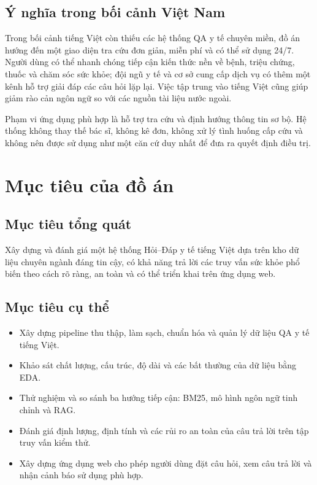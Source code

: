 \documentclass[12pt,a4paper,oneside]{report}
\begin{document}
\subsection{Ý nghĩa trong bối cảnh Việt Nam}
Trong bối cảnh tiếng Việt còn thiếu các hệ thống QA y tế chuyên miền, đồ án hướng đến một giao diện tra cứu đơn giản, miễn phí và có thể sử dụng 24/7. Người dùng có thể nhanh chóng tiếp cận kiến thức nền về bệnh, triệu chứng, thuốc và chăm sóc sức khỏe; đội ngũ y tế và cơ sở cung cấp dịch vụ có thêm một kênh hỗ trợ giải đáp các câu hỏi lặp lại. Việc tập trung vào tiếng Việt cũng giúp giảm rào cản ngôn ngữ so với các nguồn tài liệu nước ngoài.

Phạm vi ứng dụng phù hợp là hỗ trợ tra cứu và định hướng thông tin sơ bộ. Hệ thống không thay thế bác sĩ, không kê đơn, không xử lý tình huống cấp cứu và không nên được sử dụng như một căn cứ duy nhất để đưa ra quyết định điều trị.

\section{Mục tiêu của đồ án}
\subsection{Mục tiêu tổng quát}
Xây dựng và đánh giá một hệ thống Hỏi--Đáp y tế tiếng Việt dựa trên kho dữ liệu chuyên ngành đáng tin cậy, có khả năng trả lời các truy vấn sức khỏe phổ biến theo cách rõ ràng, an toàn và có thể triển khai trên ứng dụng web.

\subsection{Mục tiêu cụ thể}
\begin{itemize}
    \item Xây dựng pipeline thu thập, làm sạch, chuẩn hóa và quản lý dữ liệu QA y tế tiếng Việt.
    \item Khảo sát chất lượng, cấu trúc, độ dài và các bất thường của dữ liệu bằng EDA.
    \item Thử nghiệm và so sánh ba hướng tiếp cận: BM25, mô hình ngôn ngữ tinh chỉnh và RAG.
    \item Đánh giá định lượng, định tính và các rủi ro an toàn của câu trả lời trên tập truy vấn kiểm thử.
    \item Xây dựng ứng dụng web cho phép người dùng đặt câu hỏi, xem câu trả lời và nhận cảnh báo sử dụng phù hợp.
\end{itemize}
\end{document}
